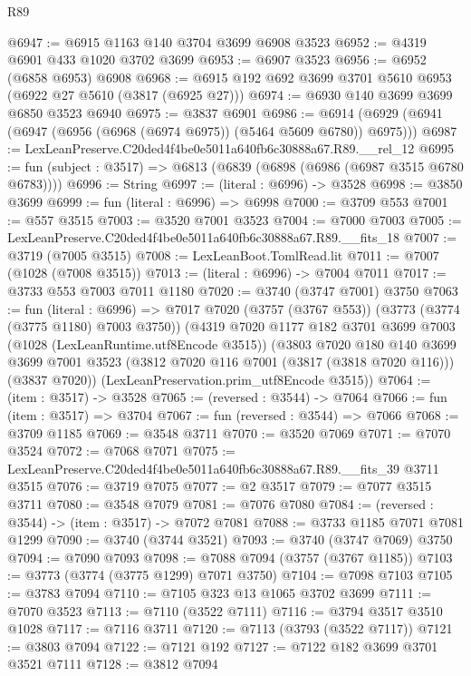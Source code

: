 \begin{lexlean}{R89}
\begin{coremodule}
@6947 := @6915 @1163 @140 @3704 @3699 @6908 @3523
@6952 := @4319 @6901 @433 @1020 @3702 @3699
@6953 := @6907 @3523
@6956 := @6952 (@6858 @6953) @6908
@6968 := @6915 @192 @692 @3699 @3701 @5610 @6953 (@6922 @27 @5610 (@3817 (@6925 @27)))
@6974 := @6930 @140 @3699 @3699 @6850 @3523 @6940
@6975 := @3837 @6901
@6986 := @6914 (@6929 (@6941 (@6947 (@6956 (@6968 (@6974 @6975)) (@5464 @5609 @6780)) @6975)))
@6987 := LexLeanPreserve.C20ded4f4be0e5011a640fb6c30888a67.R89.__rel_12
@6995 := fun (subject : @3517) => @6813 (@6839 (@6898 (@6986 (@6987 @3515 @6780 @6783))))
@6996 := String
@6997 := (literal : @6996) -> @3528
@6998 := @3850 @3699
@6999 := fun (literal : @6996) => @6998
@7000 := @3709 @553
@7001 := @557 @3515
@7003 := @3520 @7001 @3523
@7004 := @7000 @7003
@7005 := LexLeanPreserve.C20ded4f4be0e5011a640fb6c30888a67.R89.__fits_18
@7007 := @3719 (@7005 @3515)
@7008 := LexLeanBoot.TomlRead.lit
@7011 := @7007 (@1028 (@7008 @3515))
@7013 := (literal : @6996) -> @7004 @7011
@7017 := @3733 @553 @7003 @7011 @1180
@7020 := @3740 (@3747 @7001) @3750
@7063 := fun (literal : @6996) =>
  @7017
    @7020
    (@3757 (@3767 @553))
    (@3773 (@3774 (@3775 @1180) @7003 @3750))
    (@4319
      @7020
      @1177
      @182
      @3701
      @3699
      @7003
      (@1028 (LexLeanRuntime.utf8Encode @3515))
      (@3803
        @7020
        @180
        @140
        @3699
        @3699
        @7001
        @3523
        (@3812 @7020 @116 @7001 (@3817 (@3818 @7020 @116)))
        (@3837 @7020))
      (LexLeanPreservation.prim_utf8Encode @3515))
@7064 := (item : @3517) -> @3528
@7065 := (reversed : @3544) -> @7064
@7066 := fun (item : @3517) => @3704
@7067 := fun (reversed : @3544) => @7066
@7068 := @3709 @1185
@7069 := @3548 @3711
@7070 := @3520 @7069
@7071 := @7070 @3524
@7072 := @7068 @7071
@7075 := LexLeanPreserve.C20ded4f4be0e5011a640fb6c30888a67.R89.__fits_39 @3711 @3515
@7076 := @3719 @7075
@7077 := @2 @3517
@7079 := @7077 @3515 @3711
@7080 := @3548 @7079
@7081 := @7076 @7080
@7084 := (reversed : @3544) -> (item : @3517) -> @7072 @7081
@7088 := @3733 @1185 @7071 @7081 @1299
@7090 := @3740 (@3744 @3521)
@7093 := @3740 (@3747 @7069) @3750
@7094 := @7090 @7093
@7098 := @7088 @7094 (@3757 (@3767 @1185))
@7103 := @3773 (@3774 (@3775 @1299) @7071 @3750)
@7104 := @7098 @7103
@7105 := @3783 @7094
@7110 := @7105 @323 @13 @1065 @3702 @3699
@7111 := @7070 @3523
@7113 := @7110 (@3522 @7111)
@7116 := @3794 @3517 @3510 @1028
@7117 := @7116 @3711
@7120 := @7113 (@3793 (@3522 @7117))
@7121 := @3803 @7094
@7122 := @7121 @192
@7127 := @7122 @182 @3699 @3701 @3521 @7111
@7128 := @3812 @7094

\end{coremodule}
\end{lexlean}
